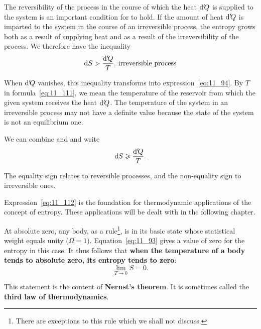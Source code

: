 The reversibility of the process in the course of which the heat $\mathrm{d}'\!Q$ is supplied to the system is an important condition for  to hold. If the amount of heat $\mathrm{d}'\!Q$ is imparted to the system in the course of an irreversible process, the entropy grows both as a result of supplying heat and as a result of the irreversibility of the process. We therefore have the inequality
\begin{equation}\label{eq:11_111}
	\mathrm{d} S > \frac{\mathrm{d}'\!Q}{T}.\,\, \text{irreversible process}
\end{equation}

\noindent
When $\mathrm{d}'\!Q$ vanishes, this inequality transforms into expression~\eqref{eq:11_94}. By $T$ in formula~\eqref{eq:11_111}, we mean the temperature of the reservoir from which the given system receives the heat $\mathrm{d}'\!Q$. The temperature of the system in an irreversible process may not have a definite value because the state of the system is not an equilibrium one.

We can combine  and  and write
\begin{equation}\label{eq:11_112}
	\mathrm{d} S \geqslant \frac{\mathrm{d}'\!Q}{T}.
\end{equation}

\noindent
The equality sign relates to reversible processes, and the non-equality sign to irreversible ones.

Expression~\eqref{eq:11_112} is the foundation for thermodynamic applications of the concept of entropy. These applications will be dealt with in the following chapter.

At absolute zero, any body, as a rule\footnote{There are exceptions to this rule which we shall not discuss.}, is in its basic state whose statistical weight equals unity ($\Omega=1$). Equation~\eqref{eq:11_93} gives a value of zero for the entropy in this case. It thus follows that \textbf{when the temperature of a body tends to absolute zero, its entropy tends to zero}:
\begin{equation}\label{eq:11_113}
	\lim_{T\to 0} S = 0.
\end{equation}

\noindent
This statement is the content of \textbf{Nernst's theorem}. It is sometimes called the \textbf{third law of thermodynamics}.
